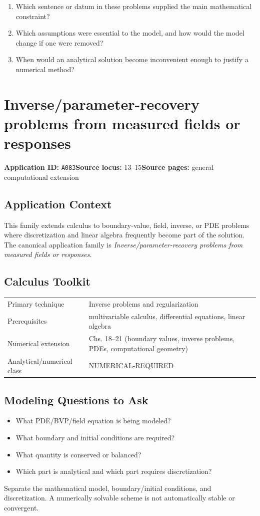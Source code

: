 \documentclass[11pt]{book}
\newcommand{\pid}[1]{\texttt{#1}}
\begin{document}
\begin{reflectionbox}\begin{enumerate}
\item Which sentence or datum in these problems supplied the main mathematical constraint?
\item Which assumptions were essential to the model, and how would the model change if one were removed?
\item When would an analytical solution become inconvenient enough to justify a numerical method?
\end{enumerate}\end{reflectionbox}
\chapter{Inverse/parameter-recovery problems from measured fields or responses}\label{app:A083}
\textbf{Application ID:} \pid{A083}\quad \textbf{Source locus:} 13–15\quad \textbf{Source pages:} general computational extension
\section*{Application Context}
This family extends calculus to boundary-value, field, inverse, or PDE problems where discretization and linear algebra frequently become part of the solution. The canonical application family is \emph{Inverse/parameter-recovery problems from measured fields or responses}.
\section*{Calculus Toolkit}
\begin{tabularx}{\textwidth}{@{}lX@{}}\toprule
Primary technique & Inverse problems and regularization \\
Prerequisites & multivariable calculus, differential equations, linear algebra \\
Numerical extension & Chs. 18–21 (boundary values, inverse problems, PDEs, computational geometry) \\
Analytical/numerical class & NUMERICAL-REQUIRED \\
\bottomrule\end{tabularx}
\section*{Modeling Questions to Ask}\begin{itemize}
\item What PDE/BVP/field equation is being modeled?
\item What boundary and initial conditions are required?
\item What quantity is conserved or balanced?
\item Which part is analytical and which part requires discretization?
\end{itemize}
\begin{errorbox}Separate the mathematical model, boundary/initial conditions, and discretization. A numerically solvable scheme is not automatically stable or convergent.\end{errorbox}
\end{document}
